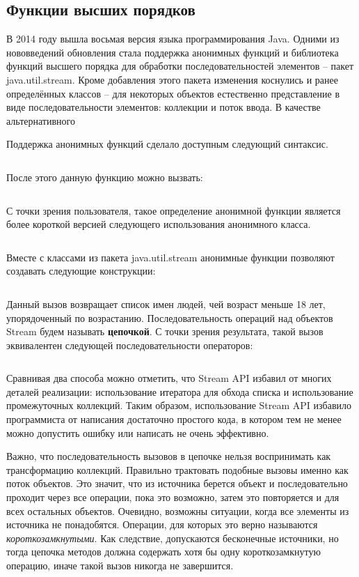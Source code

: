\subsection{Функции высших порядков} \label{ho-functions}
В 2014 году вышла восьмая версия языка программирования Java. Одними из нововведений обновления 
стала поддержка анонимных функций и библиотека функций высшего порядка для обработки 
последовательностей элементов -- пакет java.util.stream. Кроме добавления этого пакета 
изменения коснулись и ранее определённых классов -- для некоторых объектов естественно 
представление в виде последовательности элементов: коллекции и поток ввода. В качестве альтернативного 

Поддержка анонимных функций сделало доступным следующий синтаксис.
\inputminted{java}{chapter1/code/Lambda.java}

После этого данную функцию можно вызвать:
\inputminted{java}{chapter1/code/UseLambda.java}

С точки зрения пользователя, такое определение анонимной функции является более короткой версией следующего использования анонимного класса.

\inputminted{java}{chapter1/code/SameAnonymous.java}

Вместе с классами из пакета java.util.stream анонимные функции позволяют создавать следующие конструкции:

\inputminted{java}{chapter1/code/StreamUsage.java}

Данный вызов возвращает список имен людей, чей возраст меньше 18 лет, упорядоченный по возрастанию.
Последовательность операций над объектов Stream будем называть \textbf{цепочкой}.
С точки зрения результата, такой вызов эквивалентен следующей последовательности операторов: 

\inputminted{java}{chapter1/code/CyclesUsage.java}

Сравнивая два способа можно отметить, что Stream API избавил от многих деталей реализации: использование итератора для обхода списка и использование промежуточных коллекций. Таким образом, использование Stream API избавило программиста от написания достаточно простого кода, в котором тем не менее можно допустить ошибку или написать не очень эффективно.

Важно, что последовательность вызовов в цепочке нельзя воспринимать как трансформацию коллекций. Правильно трактовать подобные вызовы именно как поток объектов. Это значит, что из источника берется объект и последовательно проходит через все операции, пока это возможно, затем это повторяется и для всех остальных объектов. Очевидно, возможны ситуации, когда все элементы из источника не понадобятся. Операции, для которых это верно называются \textit{короткозамкнутыми}. Как следствие, допускаются бесконечные источники, но тогда цепочка методов должна содержать хотя бы одну короткозамкнутую операцию, иначе такой вызов никогда не завершится.

